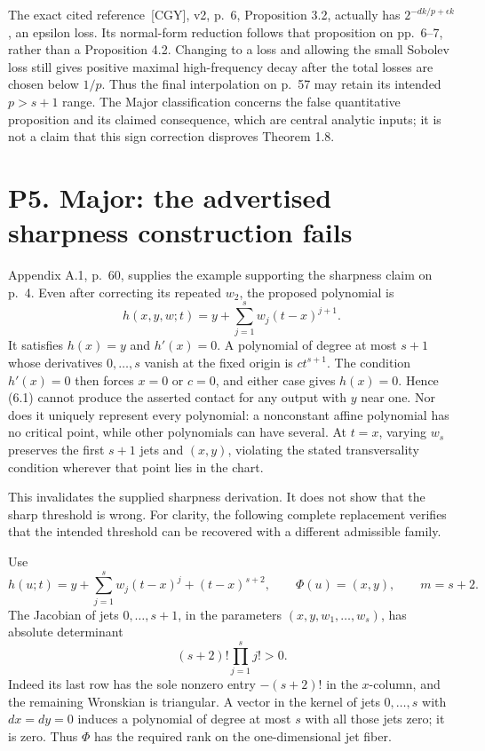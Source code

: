 \documentclass[10pt]{article}
\begin{document}
The exact cited reference [CGY], v2, p. 6, Proposition 3.2, actually has \(2^{-dk/p+\epsilon k}\), an epsilon loss. Its normal-form reduction follows that proposition on pp. 6–7, rather than a Proposition 4.2. Changing to a loss and allowing the small Sobolev loss still gives positive maximal high-frequency decay after the total losses are chosen below \(1/p\). Thus the final interpolation on p. 57 may retain its intended \(p>s+1\) range. The Major classification concerns the false quantitative proposition and its claimed consequence, which are central analytic inputs; it is not a claim that this sign correction disproves Theorem 1.8.\par
\section*{P5. Major: the advertised sharpness construction fails}
Appendix A.1, p. 60, supplies the example supporting the sharpness claim on p. 4. Even after correcting its repeated \(w_2\), the proposed polynomial is \[h(x,y,w;t)=y+\sum_{j=1}^s w_j(t-x)^{j+1}.
 \tag{6.1}\] It satisfies \(h(x)=y\) and \(h'(x)=0\). A polynomial of degree at most \(s+1\) whose derivatives \(0,\ldots,s\) vanish at the fixed origin is \(ct^{s+1}\). The condition \(h'(x)=0\) then forces \(x=0\) or \(c=0\), and either case gives \(h(x)=0\). Hence (6.1) cannot produce the asserted contact for any output with \(y\) near one. Nor does it uniquely represent every polynomial: a nonconstant affine polynomial has no critical point, while other polynomials can have several. At \(t=x\), varying \(w_s\) preserves the first \(s+1\) jets and \((x,y)\), violating the stated transversality condition wherever that point lies in the chart.\par
This invalidates the supplied sharpness derivation. It does not show that the sharp threshold is wrong. For clarity, the following complete replacement verifies that the intended threshold can be recovered with a different admissible family.\par
Use \[h(u;t)=y+\sum_{j=1}^s w_j(t-x)^j+(t-x)^{s+2},
 \qquad \Phi(u)=(x,y),\qquad m=s+2.
 \tag{6.2}\] The Jacobian of jets \(0,\ldots,s+1\), in the parameters \((x,y,w_1,\ldots,w_s)\), has absolute determinant \[(s+2)!\prod_{j=1}^s j!>0.\] Indeed its last row has the sole nonzero entry \(-(s+2)!\) in the \(x\)-column, and the remaining Wronskian is triangular. A vector in the kernel of jets \(0,\ldots,s\) with \(dx=dy=0\) induces a polynomial of degree at most \(s\) with all those jets zero; it is zero. Thus \(\Phi\) has the required rank on the one-dimensional jet fiber.\par
\end{document}
